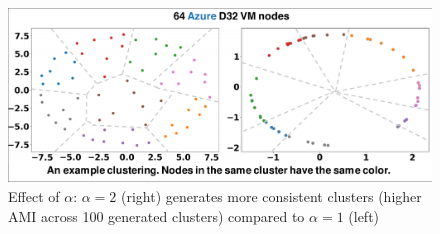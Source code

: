 

\begin{figure}
	\centering
	\includegraphics[width=.7\linewidth, trim= 4 4 4 4,clip]{Figures/clusters.pdf}
	\caption{Effect of $\alpha$: $\alpha = 2$ (right) generates more consistent clusters (higher AMI across 100 generated clusters) compared to $\alpha=1$ (left)} %
	\label{fig:legacy_why}
\end{figure}



